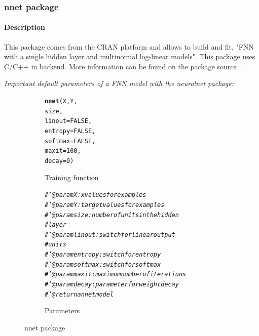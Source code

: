 \documentclass[letter,8pt]{article}\usepackage[]{graphicx}\usepackage[]{color}
\makeatletter
\newcommand{\hlnum}[1]{\textcolor[rgb]{0.686,0.059,0.569}{#1}}%
\newcommand{\hlcom}[1]{\textcolor[rgb]{0.678,0.584,0.686}{\textit{#1}}}%
\newcommand{\hlstd}[1]{\textcolor[rgb]{0.345,0.345,0.345}{#1}}%
\newcommand{\hlkwc}[1]{\textcolor[rgb]{0.333,0.667,0.333}{#1}}%
\newcommand{\hlkwd}[1]{\textcolor[rgb]{0.737,0.353,0.396}{\textbf{#1}}}%
\newenvironment{kframe}{%
 \def\at@end@of@kframe{}%
 \ifinner\ifhmode%
  \def\at@end@of@kframe{\end{minipage}}%
  \begin{minipage}{\columnwidth}%
 \fi\fi%
 \def\FrameCommand##1{\hskip\@totalleftmargin \hskip-\fboxsep
 \colorbox{shadecolor}{##1}\hskip-\fboxsep
     \hskip-\linewidth \hskip-\@totalleftmargin \hskip\columnwidth}%
 \MakeFramed {\advance\hsize-\width
   \@totalleftmargin\z@ \linewidth\hsize
   \@setminipage}}%
 {\par\unskip\endMakeFramed%
 \at@end@of@kframe}
\newenvironment{knitrout}{}{} %
\makeatother
\begin{document}
\subsubsection{\textbf{nnet package}}
\paragraph{Description}
This package comes from the CRAN platform and allows to build and fit, "FNN with a single hidden layer and multinomial log-linear models". This package uses C/C++ in backend. More information can be found on the package source \cite{nnet2020}.

\textit{Important default parameters of a FNN model with the neuralnet package:}
\begin{figure}[H]
  \begin{subfigure}{0.5\textwidth}
\begin{knitrout}
\color{fgcolor}\begin{kframe}
\begin{alltt}
\hlkwd{nnet}\hlstd{(X, Y,}
     \hlstd{size,}
     \hlkwc{linout}\hlstd{=}\hlnum{FALSE}\hlstd{,}
     \hlkwc{entropy}\hlstd{=}\hlnum{FALSE}\hlstd{,}
     \hlkwc{softmax}\hlstd{=}\hlnum{FALSE}\hlstd{,}
     \hlkwc{maxit} \hlstd{=} \hlnum{100}\hlstd{,}
     \hlkwc{decay} \hlstd{=} \hlnum{0}\hlstd{)}
\end{alltt}
\end{kframe}
\end{knitrout}
    \caption{Training function}
  \end{subfigure}
  \begin{subfigure}{0.5\textwidth}
    \centering
\begin{knitrout}
\color{fgcolor}\begin{kframe}
\begin{alltt}
  \hlcom{#' @param X : x values for examples}
  \hlcom{#' @param Y : target values for examples}
  \hlcom{#' @param size : number of units in the hidden }
  \hlcom{#         layer}
  \hlcom{#' @param linout : switch for linear output }
  \hlcom{#         units}
  \hlcom{#' @param entropy : switch for entropy}
  \hlcom{#' @param softmax : switch for softmax}
  \hlcom{#' @param maxit : maximum number of iterations}
  \hlcom{#' @param decay : parameter for weight decay}
  \hlcom{#' @return a nnet model}
\end{alltt}
\end{kframe}
\end{knitrout}
    \caption{Parameters}
  \end{subfigure}
    \caption{nnet package}
\end{figure}
\end{document}

